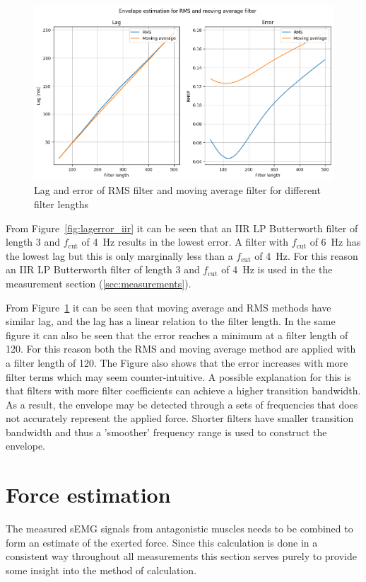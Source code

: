 \begin{figure}[h!t]
	\begin{center}
		\includegraphics[width=1.0\columnwidth]{images/lagerror_rms_and_MA_filter.png}
	\end{center}
	\caption{Lag and error of RMS filter and moving average filter for different filter lengths}
	\label{fig:lagerror_RMS_MA}
\end{figure}

From Figure~\ref{fig:lagerror_iir} it can be seen that an IIR LP Butterworth filter of length 3 and $f_\text{cut}$ of \SI{4}{\hertz} results in the lowest error. A filter with $f_\text{cut}$ of \SI{6}{\hertz} has the lowest lag but this is only marginally less than a $f_\text{cut}$ of \SI{4}{\hertz}. For this reason an IIR LP Butterworth filter of length 3 and $f_\text{cut}$ of \SI{4}{\hertz} is used in the the measurement section (\ref{sec:measurements}).

From Figure~\ref{fig:lagerror_RMS_MA} it can be seen that moving average and RMS methods have similar lag, and the lag has a linear relation to the filter length. In the same figure it can also be seen that the error reaches a minimum at a filter length of 120. For this reason both the RMS and moving average method are applied with a filter length of 120. The Figure also shows that the error increases with more filter terms which may seem counter-intuitive. A possible explanation for this is that filters with more filter coefficients can achieve a higher transition bandwidth. As a result, the envelope may be detected through a sets of frequencies that does not accurately represent the applied force. Shorter filters have smaller transition bandwidth and thus a 'smoother' frequency range is used to construct the envelope.

\section{Force estimation}\label{section:force_estimation}
The measured sEMG signals from antagonistic muscles needs to be combined to form an estimate of the exerted force. Since this calculation is done in a consistent way throughout all measurements this section serves purely to provide some insight into the method of calculation.


